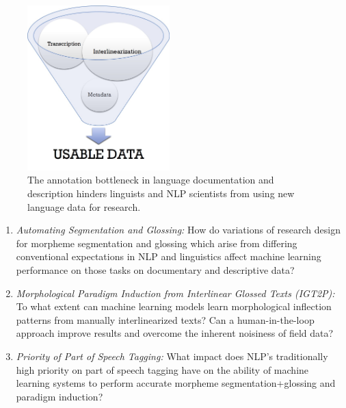 \begin{figure}[!b]
    \centering
    \includegraphics[width=5.5cm]{figs/AnnotationFunnel.jpg}
    \caption[Annotation Bottleneck]{The annotation bottleneck in language documentation and description hinders linguists and NLP scientists from using new language data for research.}
    \label{fig:bottleneck}
\end{figure}


\begin{enumerate}
\item{} \emph{Automating Segmentation and Glossing:} How do variations of research design for morpheme segmentation and glossing which arise from differing conventional expectations in NLP and linguistics affect machine learning performance on those tasks on documentary and descriptive data? 

\item{} \emph{Morphological Paradigm Induction from Interlinear Glossed Texts (IGT2P):} To what extent can machine learning models learn morphological inflection patterns from manually interlinearized texts? Can a human-in-the-loop approach improve results and overcome the inherent noisiness of field data?

\item \emph{Priority of Part of Speech Tagging:} 
What impact does NLP's traditionally high priority on part of speech tagging have on the ability of machine learning systems to perform accurate morpheme segmentation+glossing and paradigm induction?
\end{enumerate}

